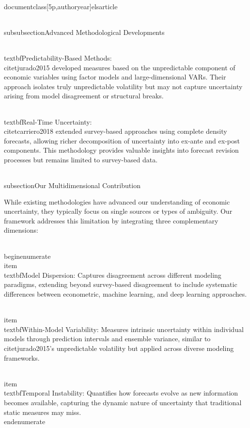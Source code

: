 \\documentclass[5p,authoryear]{elsarticle}
\begin{document}
\\subsubsection{Advanced Methodological Developments}

\\textbf{Predictability-Based Methods:} \\citet{jurado2015} developed measures based on the unpredictable component of economic variables using factor models and large-dimensional VARs. Their approach isolates truly unpredictable volatility but may not capture uncertainty arising from model disagreement or structural breaks.

\\textbf{Real-Time Uncertainty:} \\citet{carriero2018} extended survey-based approaches using complete density forecasts, allowing richer decomposition of uncertainty into ex-ante and ex-post components. This methodology provides valuable insights into forecast revision processes but remains limited to survey-based data.

\\subsection{Our Multidimensional Contribution}

While existing methodologies have advanced our understanding of economic uncertainty, they typically focus on single sources or types of ambiguity. Our framework addresses this limitation by integrating three complementary dimensions:

\\begin{enumerate}
    \\item \\textbf{Model Dispersion:} Captures disagreement across different modeling paradigms, extending beyond survey-based disagreement to include systematic differences between econometric, machine learning, and deep learning approaches.
    
    \\item \\textbf{Within-Model Variability:} Measures intrinsic uncertainty within individual models through prediction intervals and ensemble variance, similar to \\citet{jurado2015}'s unpredictable volatility but applied across diverse modeling frameworks.
    
    \\item \\textbf{Temporal Instability:} Quantifies how forecasts evolve as new information becomes available, capturing the dynamic nature of uncertainty that traditional static measures may miss.
\\end{enumerate}
\end{document}
